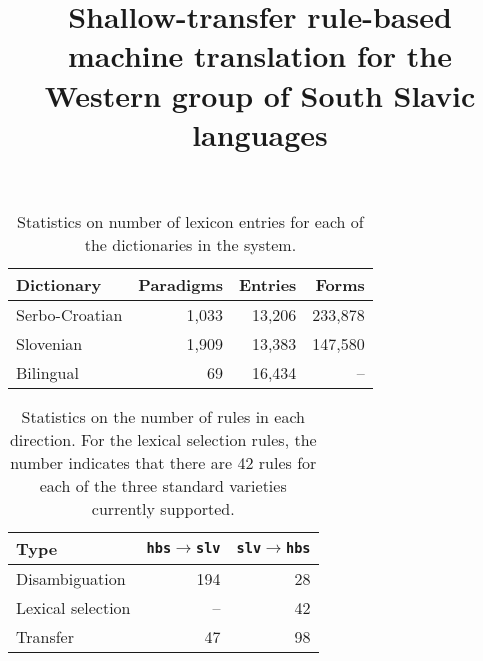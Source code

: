 \documentclass[10pt, a4paper]{article}
\title{Shallow-transfer rule-based machine translation for the Western group of South Slavic languages}
\begin{document}
\maketitleabstract














\begin{table}

\begin{center}
\begin{tabular}{|l|rrr|}
\hline
\textbf{Dictionary} & \textbf{Paradigms} & \textbf{Entries} & \textbf{Forms} \\
\hline
Serbo-Croatian &  1,033 & 13,206 & 233,878 \\
Slovenian &  1,909 & 13,383 & 147,580 \\
\hline
Bilingual &  69 &  16,434 & -- \\
\hline
\end{tabular}
\caption{Statistics on number of lexicon entries for each of the dictionaries in the 
   system.}
\label{table:lexicons}
\end{center}

\end{table}

\begin{table}
\begin{center}
\begin{tabular}{|l|rr|}
\hline
 \textbf{Type}      & \texttt{hbs}$\rightarrow$\texttt{slv} & \texttt{slv}$\rightarrow$\texttt{hbs}\\
\hline
Disambiguation      &     194              &     28 \\
Lexical selection   &     --            &  42 \\
Transfer            &                47 &  98 \\
\hline

\end{tabular}
 \caption{Statistics on the number of rules in each direction. For the lexical selection rules, 
   the number indicates that there are 42 rules for each of the three standard varieties currently
   supported.}
\label{table:rules}
\end{center}
\end{table}
\end{document}
